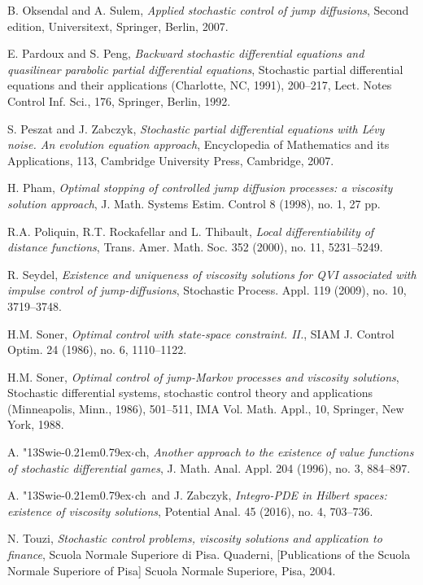 \documentclass[amscd,amssymb,11pt]{article}
\numberwithin{theorem}{section}
\numberwithin{equation}{section}
\def\Swiech{{\accent"13S}wie{\hbox{\kern -0.21em\lower 0.79ex\hbox{$\textfont1=\scriptfont1\lhook$}}}ch}
\begin{document}
\begin{thebibliography}{99}
 B. Oksendal and A. Sulem, {\it Applied stochastic control of jump diffusions}, Second edition, Universitext, Springer, Berlin, 2007.


E. Pardoux and S. Peng, {\it Backward stochastic differential equations and quasilinear parabolic partial differential equations}, Stochastic partial differential equations and their applications (Charlotte, NC, 1991), 200--217, Lect. Notes Control Inf. Sci., 176, Springer, Berlin, 1992.

 S. Peszat and J. Zabczyk, {\it Stochastic partial differential equations
with L\'evy noise. An evolution equation approach}, Encyclopedia of
Mathematics and its Applications, 113, Cambridge University Press,
Cambridge, 2007.

H. Pham,
{\it Optimal stopping of controlled jump diffusion processes: a viscosity solution approach},
J. Math. Systems Estim. Control 8 (1998), no. 1, 27 pp.

 R.A. Poliquin, R.T. Rockafellar and L. Thibault, {\it Local differentiability of distance functions}, Trans. Amer. Math. Soc. 352 (2000), no. 11, 5231--5249.

R. Seydel,
{\it Existence and uniqueness of viscosity solutions for QVI associated with impulse control of jump-diffusions},
Stochastic Process. Appl. 119 (2009), no. 10, 3719--3748.

H.M. Soner,
{\it Optimal control with state-space constraint. II.},
SIAM J. Control Optim. 24 (1986), no. 6, 1110--1122.

H.M. Soner, {\it Optimal control of jump-Markov processes and viscosity solutions},
Stochastic differential systems, stochastic control theory and applications (Minneapolis, Minn., 1986),
501--511, IMA Vol. Math. Appl., 10, Springer, New York, 1988.

A. \Swiech, {\it Another approach to the existence of value functions of stochastic differential games}, J. Math. Anal. Appl. 204 (1996), no. 3, 884--897.

 A. \Swiech\ and J. Zabczyk,
{\it Integro-PDE in Hilbert spaces: existence of viscosity solutions}, Potential Anal. 45 (2016), no. 4, 703--736.

N. Touzi, {\it Stochastic control problems, viscosity solutions and application to finance}, Scuola Normale Superiore di Pisa. Quaderni, [Publications of the Scuola Normale Superiore of Pisa] Scuola Normale Superiore, Pisa, 2004.


\end{thebibliography}
\end{document}
